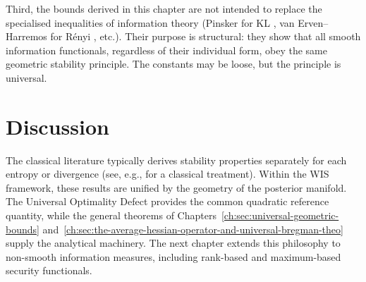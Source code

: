 Third, the bounds derived in this chapter are not intended to replace
the specialised inequalities of information theory (Pinsker for KL \cite{csiszar2011information},
van Erven--Harremos for R\'enyi \cite{vanerven2014renyi}, etc.).  Their purpose is structural:
they show that all smooth information functionals, regardless of their
individual form, obey the same geometric stability principle.  The
constants may be loose, but the principle is universal.

\section{Discussion}\label{ch:sec:discussion-smooth_functionals}

The classical literature typically derives stability properties
separately for each entropy or divergence (see, e.g.,
\cite{csiszar2011information} for a classical treatment).
Within the WIS framework, these results are unified by the geometry of
the posterior manifold.
The Universal Optimality Defect provides the common quadratic reference
quantity, while the general theorems of Chapters~\ref{ch:sec:universal-geometric-bounds} and~\ref{ch:sec:the-average-hessian-operator-and-universal-bregman-theo} supply the
analytical machinery.
The next chapter extends this philosophy to non-smooth information
measures, including rank-based and maximum-based security functionals.
